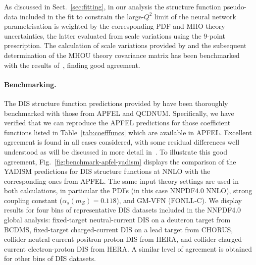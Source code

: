 As discussed in Sect.~\ref{sec:fitting}, in our analysis the \yadism
structure function pseudo-data included in the fit to constrain the
large-$Q^2$ limit of the neural network parametrisation is weighted
by the corresponding PDF and MHO theory uncertainties, the latter
evaluated from scale variations using the 9-point prescription.
%
The calculation of scale variations provided by \yadism and the subsequent
determination of the MHOU theory covariance matrix has been benchmarked
with the results of~\cite{NNPDF:2019ubu}, finding good agreement.

\paragraph{Benchmarking.}
%
The DIS structure function predictions provided by \yadism
have been thoroughly benchmarked  with those from {\sc\small
  APFEL} and {\sc\small QCDNUM}.
%
Specifically, we have verified that we can reproduce
the {\sc\small APFEL} predictions for those coefficient functions listed
in Table~\ref{tab:coefffuncs} which are available in {\sc\small APFEL}.
%
Excellent agreement is found in all cases considered, with some residual
differences well understood as will be discussed in more detail in~\cite{yadism}.
%
To illustrate this good agreement,
Fig.~\ref{fig:benchmark-apfel-yadism} displays
the comparison of the {\sc\small YADISM} predictions for DIS structure functions at NNLO
with the corresponding ones from {\sc\small APFEL}.
%
The same input theory settings are used in both calculations,
in particular the PDFs (in this case NNPDF4.0 NNLO), strong coupling constant ($\alpha_s(m_Z)=0.118$),
and GM-VFN (FONLL-C).
%
We display results for four bins of representative DIS datasets included
in the NNPDF4.0 global analysis: fixed-target neutral-current DIS on a deuteron target
from BCDMS, fixed-target charged-current DIS on a lead target
from CHORUS, collider neutral-current positron-proton DIS from HERA,
and collider charged-current electron-proton DIS from HERA.
%
A similar level of agreement is obtained for other bins
of DIS datasets.

